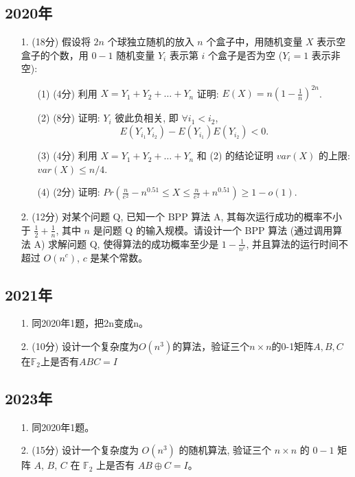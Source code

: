 \documentclass{article}
\begin{document}
\subsection*{2020年}
\begin{itemize}
    \item[1.]  (18分) 假设将 $2n$ 个球独立随机的放入 $n$ 个盒子中，用随机变量 $X$ 表示空盒子的个数，用 $0-1$ 随机变量 $Y_i$ 表示第 $i$ 个盒子是否为空 ($Y_i=1$ 表示非空):
    \begin{itemize}
        \item[(1)] (4分) 利用 $X=Y_1+Y_2+\dots+Y_n$ 证明: $E(X) = n \left(1-\frac{1}{n}\right)^{2n}$.
        \item[(2)] (8分) 证明: $Y_i$ 彼此负相关, 即 $\forall i_1 < i_2$,
        $$ E(Y_{i_1}Y_{i_2}) - E(Y_{i_1})E(Y_{i_2}) < 0. $$
        \item[(3)] (4分) 利用 $X=Y_1+Y_2+\dots+Y_n$ 和 (2) 的结论证明 $var(X)$ 的上限: $var(X) \le n/4$.
        \item[(4)] (2分) 证明: $Pr \left( \frac{n}{e^2} - n^{0.51} \le X \le \frac{n}{e^2} + n^{0.51} \right) \ge 1-o(1)$.
    \end{itemize}
    \vspace{18em} %
    \item[2.] (12分) 对某个问题 Q, 已知一个 BPP 算法 A, 其每次运行成功的概率不小于 $\frac{1}{2}+\frac{1}{n}$, 其中 $n$ 是问题 Q 的输入规模。请设计一个 BPP 算法 (通过调用算法 A) 求解问题 Q, 使得算法的成功概率至少是 $1-\frac{1}{n^c}$, 并且算法的运行时间不超过 $O(n^c)$, $c$ 是某个常数。
\end{itemize}

\newpage
\subsection*{2021年}
\begin{itemize}
    \item[1.] 同2020年1题，把2n变成n。
    \vspace{1em} %
    \item[2.] (10分) 设计一个复杂度为$O(n^3)$的算法，验证三个$n\times n$的0-1矩阵$A,B,C$在$\mathbb{F}_2$上是否有$ABC=I$
\end{itemize}

\newpage
\subsection*{2023年}
\begin{itemize}
    \item[1.] 同2020年1题。
    \vspace{1em} 
    \item[2.] (15分) 设计一个复杂度为 $O(n^3)$ 的随机算法, 验证三个 $n \times n$ 的 $0-1$ 矩阵 $A$, $B$, $C$ 在 $\mathbb{F}_2$ 上是否有 $AB \oplus C = I$。
\end{itemize}
\end{document}
